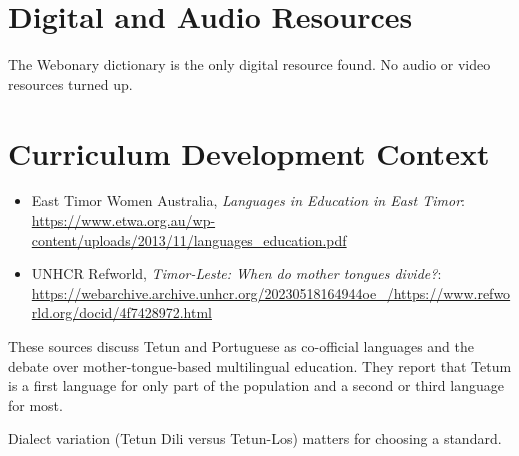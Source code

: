 \documentclass[12pt]{article}
\begin{document}
\section{Digital and Audio Resources}
The Webonary dictionary is the only digital resource found. No audio or video resources turned up.

\section{Curriculum Development Context}
\begin{itemize}
\item East Timor Women Australia, \emph{Languages in Education in East Timor}: \url{https://www.etwa.org.au/wp-content/uploads/2013/11/languages_education.pdf}
\item UNHCR Refworld, \emph{Timor-Leste: When do mother tongues divide?}: \url{https://webarchive.archive.unhcr.org/20230518164944oe_/https://www.refworld.org/docid/4f7428972.html}
\end{itemize}
These sources discuss Tetun and Portuguese as co-official languages and the debate over mother-tongue-based multilingual education. They report that Tetum is a first language for only part of the population and a second or third language for most.

Dialect variation (Tetun Dili versus Tetun-Los) matters for choosing a standard.
\end{document}
